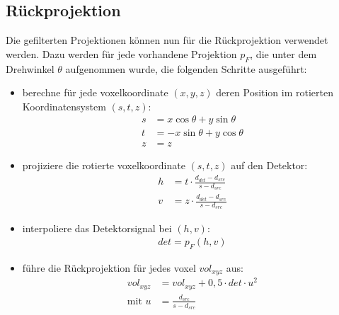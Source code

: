 \subsection{Rückprojektion}\label{sssec:backprojection}

Die gefilterten Projektionen können nun für die Rückprojektion verwendet werden. Dazu werden für jede vorhandene
Projektion $p_F$, die unter dem Drehwinkel $\theta$ aufgenommen wurde, die folgenden Schritte ausgeführt:

\begin{itemize}
    \item berechne für jede \gls{voxel}koordinate $(x, y, z)$ deren Position im rotierten Koordinatensystem
          $(s, t, z)$:
        \begin{equation}
            \begin{aligned}
                s &= x \cos \theta + y \sin \theta\\
                t &= -x \sin \theta + y \cos \theta\\
                z &= z
            \end{aligned}
        \end{equation}

    \item projiziere die rotierte \gls{voxel}koordinate $(s, t, z)$ auf den Detektor:
        \begin{equation}
            \begin{aligned}
                h &= t \cdot \frac{d_{det} - d_{src}}{s - d_{src}}\\
                v &= z \cdot \frac{d_{det} - d_{src}}{s - d_{src}}
            \end{aligned}
        \end{equation}

    \item interpoliere das Detektorsignal bei $(h, v)$:
        \begin{equation}
            \begin{aligned}
                det = p_F(h, v)
            \end{aligned}
        \end{equation}

    \item führe die Rückprojektion für jedes \gls{voxel} $vol_{xyz}$ aus:
        \begin{equation}
            \begin{aligned}
                vol_{xyz} &= vol_{xyz} + 0{,}5 \cdot det \cdot u^2\\
                \text{mit } u &= \frac{d_{src}}{s - d_{src}}
            \end{aligned}
        \end{equation}
\end{itemize}
